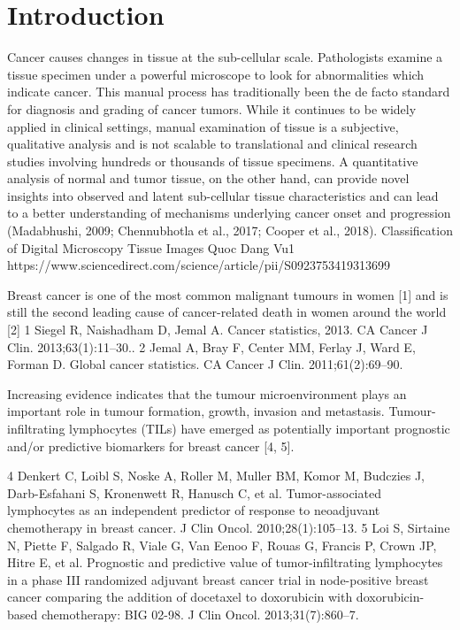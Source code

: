
\chapter{Introduction}\label{chapter:introduction}
Cancer causes changes in tissue at the sub-cellular scale. Pathologists examine a tissue specimen
under a powerful microscope to look for abnormalities which indicate cancer. This manual
process has traditionally been the de facto standard for diagnosis and grading of cancer tumors.
While it continues to be widely applied in clinical settings, manual examination of tissue is a
subjective, qualitative analysis and is not scalable to translational and clinical research studies
involving hundreds or thousands of tissue specimens. A quantitative analysis of normal and tumor
tissue, on the other hand, can provide novel insights into observed and latent sub-cellular tissue characteristics and can lead to a better understanding of
mechanisms underlying cancer onset and progression
(Madabhushi, 2009; Chennubhotla et al., 2017;
Cooper et al., 2018). 
Classification of Digital Microscopy
Tissue Images
Quoc Dang Vu1
https://www.sciencedirect.com/science/article/pii/S0923753419313699

Breast cancer is one of the most common malignant tumours in women [1] and is still the second leading cause of cancer-related death in women around the world [2]
1 Siegel R, Naishadham D, Jemal A. Cancer statistics, 2013. CA Cancer J Clin. 2013;63(1):11–30..
2 Jemal A, Bray F, Center MM, Ferlay J, Ward E, Forman D. Global cancer statistics. CA Cancer J Clin. 2011;61(2):69–90.

Increasing evidence indicates that the tumour microenvironment plays an important role in tumour formation, growth, invasion and metastasis. Tumour-infiltrating lymphocytes (TILs) have emerged as potentially important prognostic and/or predictive biomarkers for breast cancer [4, 5].

4 Denkert C, Loibl S, Noske A, Roller M, Muller BM, Komor M, Budczies J, Darb-Esfahani S, Kronenwett R, Hanusch C, et al. Tumor-associated lymphocytes as an independent predictor of response to neoadjuvant chemotherapy in breast cancer. J Clin Oncol. 2010;28(1):105–13.
5 Loi S, Sirtaine N, Piette F, Salgado R, Viale G, Van Eenoo F, Rouas G, Francis P, Crown JP, Hitre E, et al. Prognostic and predictive value of tumor-infiltrating lymphocytes in a phase III randomized adjuvant breast cancer trial in node-positive breast cancer comparing the addition of docetaxel to doxorubicin with doxorubicin-based chemotherapy: BIG 02-98. J Clin Oncol. 2013;31(7):860–7.